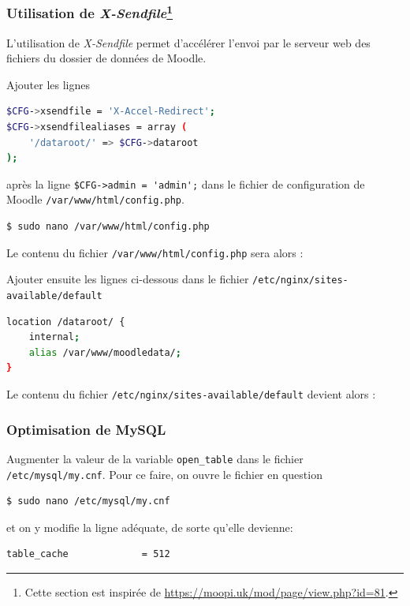 \documentclass[11pt]{article}
\begin{document}
\subsubsection[Utilisation de \emph{X-Sendfile}]{Utilisation de \emph{X-Sendfile}\footnote{Cette section est inspirée de \url{https://moopi.uk/mod/page/view.php?id=81}.}}

L'utilisation de \emph{X-Sendfile} permet d'accélérer l'envoi par le serveur web des fichiers du dossier de données de Moodle.

Ajouter les lignes
\begin{lstlisting}[language=bash]
$CFG->xsendfile = 'X-Accel-Redirect';
$CFG->xsendfilealiases = array (
    '/dataroot/' => $CFG->dataroot
);
\end{lstlisting}
après la ligne \lstinline{$CFG->admin = 'admin';} dans le fichier de configuration de Moodle \lstinline{/var/www/html/config.php}.

\begin{lstlisting}[language=bash]
$ sudo nano /var/www/html/config.php
\end{lstlisting}

Le contenu du fichier \lstinline{/var/www/html/config.php} sera alors :


Ajouter ensuite les lignes ci-dessous dans le fichier \lstinline{/etc/nginx/sites-available/default}

\begin{lstlisting}[language=bash]
location /dataroot/ {
    internal;
    alias /var/www/moodledata/;
}
\end{lstlisting}

Le contenu du fichier \lstinline{/etc/nginx/sites-available/default} devient alors :


\subsubsection{Optimisation de MySQL}

Augmenter la valeur de la variable \lstinline{open_table} dans le fichier \lstinline{/etc/mysql/my.cnf}. Pour ce faire, on ouvre le fichier en question
\begin{lstlisting}[language=bash]
$ sudo nano /etc/mysql/my.cnf
\end{lstlisting}

et on y modifie la ligne adéquate, de sorte qu'elle devienne:
\begin{lstlisting}[language=bash]
table_cache             = 512
\end{lstlisting}
\end{document}
